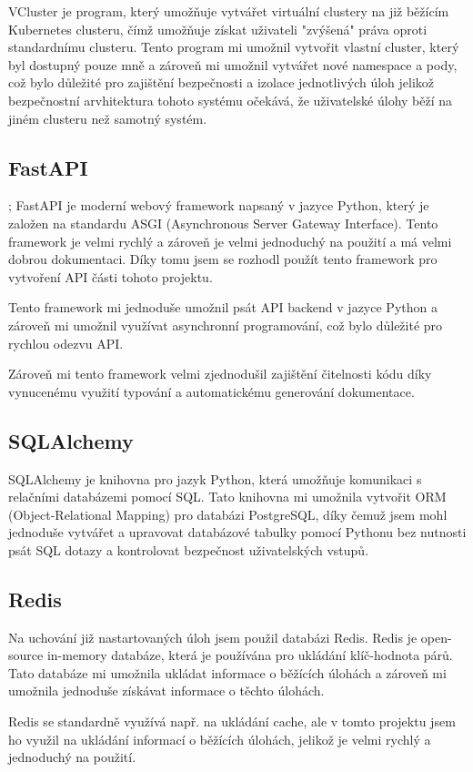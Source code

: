\documentclass[12pt, a4paper,
oneside,      %
openright
]{report}
\begin{document}
VCluster je program, který umožňuje vytvářet virtuální clustery na již běžícím Kubernetes clusteru, čímž umožňuje získat uživateli "zvýšená" práva oproti standardnímu clusteru. Tento program mi umožnil vytvořit vlastní cluster, který byl dostupný pouze mně a zároveň mi umožnil vytvářet nové namespace a pody, což bylo důležité pro zajištění bezpečnosti a izolace jednotlivých úloh jelikož bezpečnostní arvhitektura tohoto systému očekává, že uživatelské úlohy běží na jiném clusteru než samotný systém.

\subsection{FastAPI};
FastAPI je moderní webový framework napsaný v jazyce Python, který je založen na standardu ASGI (Asynchronous Server Gateway Interface). Tento framework je velmi rychlý a zároveň je velmi jednoduchý na použití a má velmi dobrou dokumentaci. Díky tomu jsem se rozhodl použít tento framework pro vytvoření API části tohoto projektu.

Tento framework mi jednoduše umožnil psát API backend v jazyce Python a zároveň mi umožnil využívat asynchronní programování, což bylo důležité pro rychlou odezvu API.

Zároveň mi tento framework velmi zjednodušil zajištění čitelnosti kódu díky vynucenému využití typování a automatickému generování dokumentace.

\subsection{SQLAlchemy}
SQLAlchemy je knihovna pro jazyk Python, která umožňuje komunikaci s relačními databázemi pomocí SQL. Tato knihovna mi umožnila vytvořit ORM (Object-Relational Mapping) pro databázi PostgreSQL, díky čemuž jsem mohl jednoduše vytvářet a upravovat databázové tabulky pomocí Pythonu bez nutnosti psát SQL dotazy a kontrolovat bezpečnost uživatelských vstupů.

\subsection{Redis}
Na uchování již nastartovaných úloh jsem použil databázi Redis. Redis je open-source in-memory databáze, která je používána pro ukládání klíč-hodnota párů. Tato databáze mi umožnila ukládat informace o běžících úlohách a zároveň mi umožnila jednoduše získávat informace o těchto úlohách.

Redis se standardně využívá např. na ukládání cache, ale v tomto projektu jsem ho využil na ukládání informací o běžících úlohách, jelikož je velmi rychlý a jednoduchý na použití.
\end{document}
